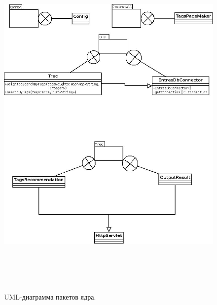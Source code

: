 \begin{figure}
\caption{UML-диаграмма пакетов ядра.}
\label{entres-uml2}
\begin{center}
  \includegraphics[width=7in,height=7in]{pics/core-packs2.jpeg}
\end{center}
\end{figure}

